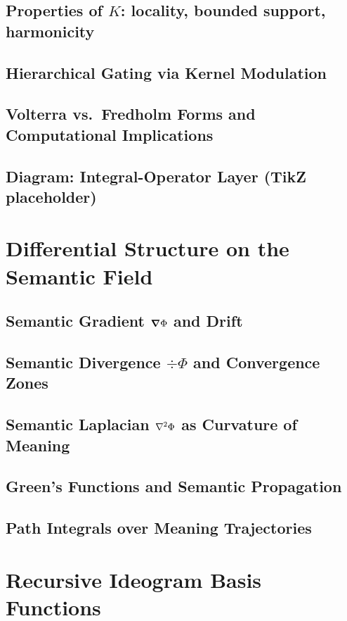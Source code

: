 \documentclass[11pt]{article}
\newcommand{\Field}{\Phi}
\newcommand{\Kernel}{K}
\begin{document}
\subsection{Properties of $\Kernel$: locality, bounded support, harmonicity}
\subsection{Hierarchical Gating via Kernel Modulation}
\subsection{Volterra vs.\ Fredholm Forms and Computational Implications}
\subsection{Diagram: Integral-Operator Layer (TikZ placeholder)}

\section{Differential Structure on the Semantic Field}
\subsection{Semantic Gradient $\grad\Field$ and Drift}
\subsection{Semantic Divergence $\div\Field$ and Convergence Zones}
\subsection{Semantic Laplacian $\laplacian\Field$ as Curvature of Meaning}
\subsection{Green’s Functions and Semantic Propagation}
\subsection{Path Integrals over Meaning Trajectories}

\section{Recursive Ideogram Basis Functions}
\end{document}
